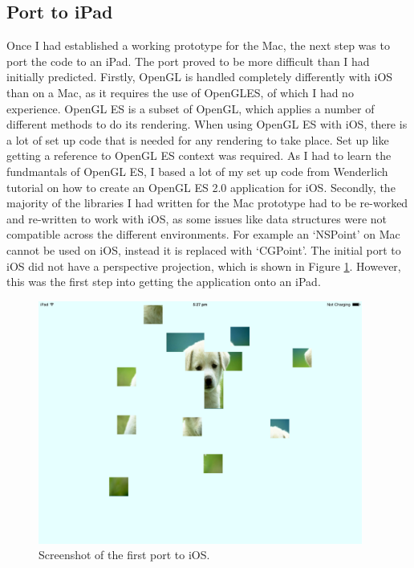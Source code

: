 \documentclass{article}
\begin{document}
\subsection{Port to iPad}
Once I had established a working prototype for the Mac, the next step was to
port the code to an iPad. The port proved to be more difficult than I had
initially predicted. Firstly, OpenGL is handled completely differently with iOS
than on a Mac, as it requires the use of \gls{OpenGLES}, of which I had no
experience. OpenGL ES is a subset of OpenGL, which applies a number of different
methods to do its rendering. When using OpenGL ES with iOS, there is a lot of
set up code that is needed for any rendering to take place. Set up like getting
a reference to OpenGL ES context was required. As I had to learn the fundmantals
of OpenGL ES, I based a lot of my set up code from Wenderlich tutorial
\cite{ref:RayOpenGL} on how to create an OpenGL ES 2.0 application for
iOS. Secondly, the majority of the libraries I had written for the Mac prototype
had to be re-worked and re-written to work with iOS, as some issues like data
structures were not compatible across the different environments. For example an
`NSPoint' on Mac cannot be used on iOS, instead it is replaced with
`CGPoint'. The initial port to iOS did not have a perspective projection, which
is shown in Figure \ref{fig:iPadPort}. However, this was the first step into
getting the application onto an iPad.

\begin{figure}[ht]
\begin{center}
\includegraphics[width=0.95\textwidth]{images/iPadPortImage}
\caption{Screenshot of the first port to iOS.}
\label{fig:iPadPort}
\end{center}
\end{figure}
\end{document}
